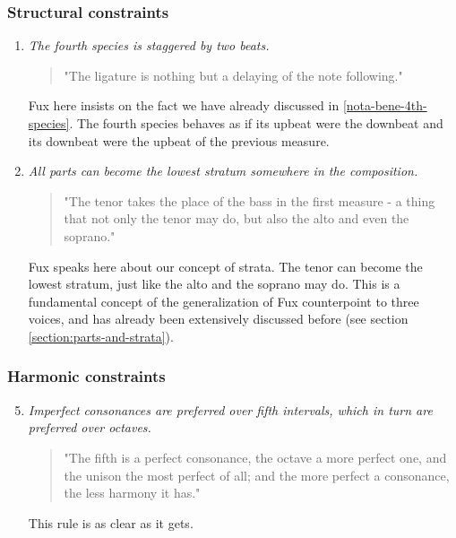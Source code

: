 \subsubsection{Structural constraints}
\begin{enumerate}[wide, label=\bfseries 4.S\arabic*]
\setcounter{enumi}{0}
    \item \textit{The fourth species is staggered by two beats.} \label{rule:delaying}    
    \begin{quotation}
        "The ligature is nothing but a delaying of the note following."
        \textcite[p.95]{GaPEng}
    \end{quotation}
    Fux here insists on the fact we have already discussed in \ref{nota-bene-4th-species}. The fourth species behaves as if its upbeat were the downbeat and its downbeat were the upbeat of the previous measure.

    \item \textit{All parts can become the lowest stratum somewhere in the composition.} \label{rule:tenor-might-take-place-of-bass}    
    \begin{quotation}
        "The tenor takes the place of the bass in the first measure - a thing that not only the tenor may do, but also the alto and even the soprano."
        \textcite[p.100]{GaPEng}
    \end{quotation}
    Fux speaks here about our concept of strata. The tenor can become the lowest stratum, just like the alto and the soprano may do. This is a fundamental concept of the generalization of Fux counterpoint to three voices, and has already been extensively discussed before (see section \ref{section:parts-and-strata}).
\end{enumerate}

\subsubsection{Harmonic constraints}
\begin{enumerate}[wide, label=\bfseries 4.H\arabic*]
    \setcounter{enumi}{4}
    \item \textit{Imperfect consonances are preferred over fifth intervals, which in turn are preferred over octaves.} \label{rule:prefer-fifths-over-octaves}    
    \begin{quotation}
        "The fifth is a perfect consonance, the octave a more perfect one, and the unison the most perfect of all; and the more perfect a consonance, the less harmony it has."
        \textcite[p.97]{GaPEng}
    \end{quotation}
    This rule is as clear as it gets.
\end{enumerate}

